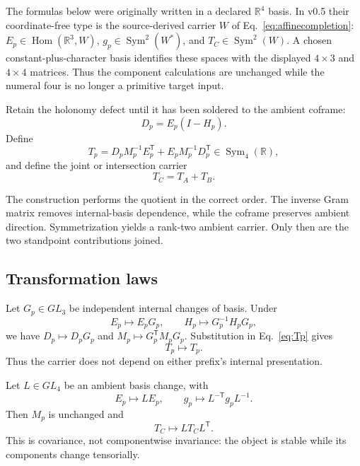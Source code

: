 \documentclass[11pt]{article}
\theoremstyle{definition}
\theoremstyle{remark}
\newcommand{\Sym}{\operatorname{Sym}}
\begin{document}
The formulas below were originally written in a declared $\mathbb R^4$ basis. In v0.5 their coordinate-free type is the source-derived carrier $W$ of Eq.~\eqref{eq:affinecompletion}: $E_p\in\operatorname{Hom}(\mathbb R^3,W)$, $g_p\in\Sym^2(W^*)$, and $T_C\in\Sym^2(W)$. A chosen constant-plus-character basis identifies these spaces with the displayed $4\times3$ and $4\times4$ matrices. Thus the component calculations are unchanged while the numeral four is no longer a primitive target input.

Retain the holonomy defect until it has been soldered to the ambient coframe:
\begin{equation}\label{eq:defect}
 D_p=E_p(I-H_p).
\end{equation}
Define
\begin{equation}\label{eq:Tp}
 T_p=D_pM_p^{-1}E_p^{\mathsf T}
     +E_pM_p^{-1}D_p^{\mathsf T}\in\Sym_4(\mathbb R),
\end{equation}
and define the joint or intersection carrier
\begin{equation}\label{eq:Tjoint}
 T_C=T_A+T_B.
\end{equation}

The construction performs the quotient in the correct order. The inverse Gram matrix removes internal-basis dependence, while the coframe preserves ambient direction. Symmetrization yields a rank-two ambient carrier. Only then are the two standpoint contributions joined.

\subsection{Transformation laws}

Let $G_p\in GL_3$ be independent internal changes of basis. Under
\begin{equation}\label{eq:internalgauge}
 E_p\mapsto E_pG_p,\qquad
 H_p\mapsto G_p^{-1}H_pG_p,
\end{equation}
we have $D_p\mapsto D_pG_p$ and $M_p\mapsto G_p^{\mathsf T}M_pG_p$. Substitution in Eq.~\eqref{eq:Tp} gives
\begin{equation}\label{eq:gaugeinvariance}
 T_p\mapsto T_p.
\end{equation}
Thus the carrier does not depend on either prefix's internal presentation.

Let $L\in GL_4$ be an ambient basis change, with
\begin{equation}
 E_p\mapsto LE_p,\qquad g_p\mapsto L^{-\mathsf T}g_pL^{-1}.
\end{equation}
Then $M_p$ is unchanged and
\begin{equation}\label{eq:ambientcovariance}
 T_C\mapsto LT_CL^{\mathsf T}.
\end{equation}
This is covariance, not componentwise invariance: the object is stable while its components change tensorially.
\end{document}
